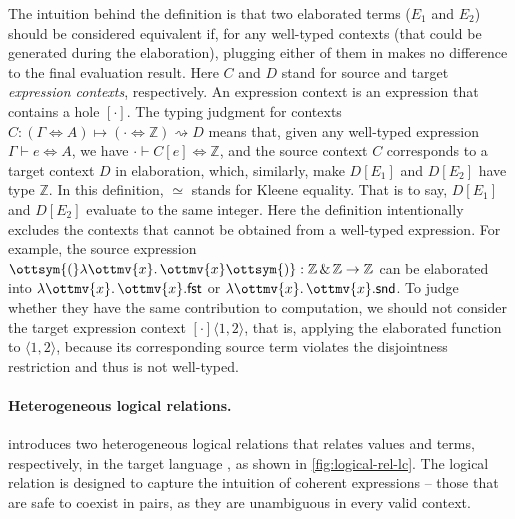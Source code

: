 \noindent
The intuition behind the definition is that two elaborated terms ($E_1$ and
$E_2$) should be considered equivalent if, for any well-typed contexts (that
could be generated during the elaboration), plugging either of them in makes no
difference to the final evaluation result. Here $C$ and $D$ stand for source and
target \emph{expression contexts}, respectively. An expression context is an
expression that contains a hole $[\cdot]$. The typing judgment for contexts
$C : (\Gamma \Leftrightarrow A) \mapsto (\cdot \Leftrightarrow  \mathbb{Z} ) \rightsquigarrow D$
means that, given any well-typed \necolus expression
$\Gamma \vdash e \Leftrightarrow A$, we have $\cdot \vdash C[e] \Leftrightarrow  \mathbb{Z} $,
and the source context $C$ corresponds to a target context $D$ in elaboration,
which, similarly, make $D[E_1]$ and $D[E_2]$ have type $ \mathbb{Z} $. In this
definition, $\simeq$ stands for Kleene equality. That is to say, $D[E_1]$ and
$D[E_2]$ evaluate to the same integer. Here the definition intentionally
excludes the contexts that cannot be obtained from a well-typed \necolus
expression. For example, the source expression $\ottsym{(}   \lambda \ottmv{x} .\, \ottmv{x}   \ottsym{)}  :   \mathbb{Z}   \, {\&} \,   \mathbb{Z}   \rightarrow   \mathbb{Z} $
can be elaborated into $  \lambda \ottmv{x} .\, \ottmv{x}   . \mathsf{fst} $ or $  \lambda \ottmv{x} .\, \ottmv{x}   . \mathsf{snd} $. To judge whether they
have the same contribution to computation, we should not consider the target
expression context $[\cdot]  \langle  1 ,  2  \rangle $, that is, applying the elaborated
function to $ \langle  1 ,  2  \rangle $, because its corresponding source term violates the
disjointness restriction and thus is not well-typed.

\paragraph{Heterogeneous logical relations.}
\necolus introduces two heterogeneous logical relations that relates values and
terms, respectively, in the target language \lambdac, as shown in
\autoref{fig:logical-rel-lc}. The logical relation is designed to capture the
intuition of coherent expressions -- those that are safe to coexist in pairs, as
they are unambiguous in every valid context.

